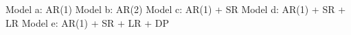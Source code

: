 \begin{table}
\begin{adjustbox}{width=\textwidth,totalheight=\textheight,keepaspectratio}
\begin{threeparttable}
\begin{tablenotes}
    \newline Model a: AR(1)
    \newline Model b: AR(2)
    \newline Model c: AR(1) + SR
    \newline Model d: AR(1) + SR + LR
    \newline Model e: AR(1) + SR + LR + DP
    \end{tablenotes}
    \end{threeparttable}
    \end{adjustbox}
\end{table}